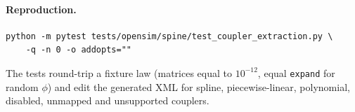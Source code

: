 \paragraph{Reproduction.}
\begin{verbatim}
python -m pytest tests/opensim/spine/test_coupler_extraction.py \
    -q -n 0 -o addopts=""
\end{verbatim}
The tests round-trip a fixture law (matrices equal to $10^{-12}$, equal
\texttt{expand} for random $\phi$) and edit the generated XML for spline,
piecewise-linear, polynomial, disabled, unmapped and unsupported couplers.
